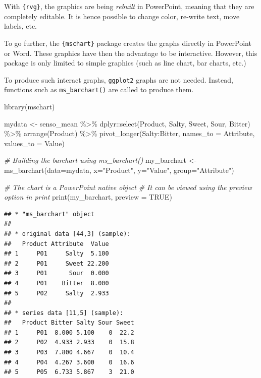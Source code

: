 \documentclass[
]{krantz}
\makeatletter
\newenvironment{Shaded}{\begin{snugshade}}{\end{snugshade}}
\newcommand{\AttributeTok}[1]{\textcolor[rgb]{0.61,0.61,0.61}{#1}}
\newcommand{\CommentTok}[1]{\textcolor[rgb]{0.37,0.37,0.37}{\textit{#1}}}
\newcommand{\ConstantTok}[1]{\textcolor[rgb]{0,0,0}{#1}}
\newcommand{\FunctionTok}[1]{\textcolor[rgb]{0,0,0}{#1}}
\newcommand{\NormalTok}[1]{#1}
\newcommand{\OtherTok}[1]{\textcolor[rgb]{0.37,0.37,0.37}{#1}}
\newcommand{\SpecialCharTok}[1]{\textcolor[rgb]{0,0,0}{#1}}
\newcommand{\StringTok}[1]{\textcolor[rgb]{0.5,0.5,0.5}{#1}}
\newenvironment{kframe}{%
\medskip{}
\setlength{\fboxsep}{.8em}
 \def\at@end@of@kframe{}%
 \ifinner\ifhmode%
  \def\at@end@of@kframe{\end{minipage}}%
  \begin{minipage}{\columnwidth}%
 \fi\fi%
 \def\FrameCommand##1{\hskip\@totalleftmargin \hskip-\fboxsep
 \colorbox{shadecolor}{##1}\hskip-\fboxsep
     \hskip-\linewidth \hskip-\@totalleftmargin \hskip\columnwidth}%
 \MakeFramed {\advance\hsize-\width
   \@totalleftmargin\z@ \linewidth\hsize
   \@setminipage}}%
 {\par\unskip\endMakeFramed%
 \at@end@of@kframe}
\renewenvironment{Shaded}{\begin{kframe}}{\end{kframe}}
\makeatother
\begin{document}
With \texttt{\{rvg\}}, the graphics are being \emph{rebuilt} in PowerPoint, meaning that they are completely editable. It is hence possible to change color, re-write text, move labels, etc.

To go further, the \texttt{\{mschart\}} package creates the graphs directly in PowerPoint or Word. These graphics have then the advantage to be interactive. However, this package is only limited to simple graphics (such as line chart, bar charts, etc.)

To produce such interact graphs, \texttt{ggplot2} graphs are not needed. Instead, functions such as \texttt{ms\_barchart()} are called to produce them.

\begin{Shaded}
\begin{Highlighting}[]
\FunctionTok{library}\NormalTok{(mschart)}

\NormalTok{mydata }\OtherTok{\textless{}{-}}\NormalTok{ senso\_mean }\SpecialCharTok{\%\textgreater{}\%}
\NormalTok{  dplyr}\SpecialCharTok{::}\FunctionTok{select}\NormalTok{(Product, Salty, Sweet, Sour, Bitter) }\SpecialCharTok{\%\textgreater{}\%} 
  \FunctionTok{arrange}\NormalTok{(Product) }\SpecialCharTok{\%\textgreater{}\%} 
  \FunctionTok{pivot\_longer}\NormalTok{(Salty}\SpecialCharTok{:}\NormalTok{Bitter, }
               \AttributeTok{names\_to =} \StringTok{\textquotesingle{}Attribute\textquotesingle{}}\NormalTok{, }\AttributeTok{values\_to =} \StringTok{\textquotesingle{}Value\textquotesingle{}}\NormalTok{)}

\CommentTok{\# Building the barchart using ms\_barchart()}
\NormalTok{my\_barchart }\OtherTok{\textless{}{-}} \FunctionTok{ms\_barchart}\NormalTok{(}\AttributeTok{data=}\NormalTok{mydata, }\AttributeTok{x=}\StringTok{"Product"}\NormalTok{, }\AttributeTok{y=}\StringTok{"Value"}\NormalTok{, }
                           \AttributeTok{group=}\StringTok{"Attribute"}\NormalTok{)}

\CommentTok{\# The chart is a PowerPoint native object }
\CommentTok{\# It can be viewed using the preview option in print}
\FunctionTok{print}\NormalTok{(my\_barchart, }\AttributeTok{preview =} \ConstantTok{TRUE}\NormalTok{)}
\end{Highlighting}
\end{Shaded}

\begin{verbatim}
## * "ms_barchart" object
## 
## * original data [44,3] (sample):
##   Product Attribute  Value
## 1     P01     Salty  5.100
## 2     P01     Sweet 22.200
## 3     P01      Sour  0.000
## 4     P01    Bitter  8.000
## 5     P02     Salty  2.933
## 
## * series data [11,5] (sample):
##   Product Bitter Salty Sour Sweet
## 1     P01  8.000 5.100    0  22.2
## 2     P02  4.933 2.933    0  15.8
## 3     P03  7.800 4.667    0  10.4
## 4     P04  4.267 3.600    0  16.6
## 5     P05  6.733 5.867    3  21.0
\end{verbatim}
\end{document}
